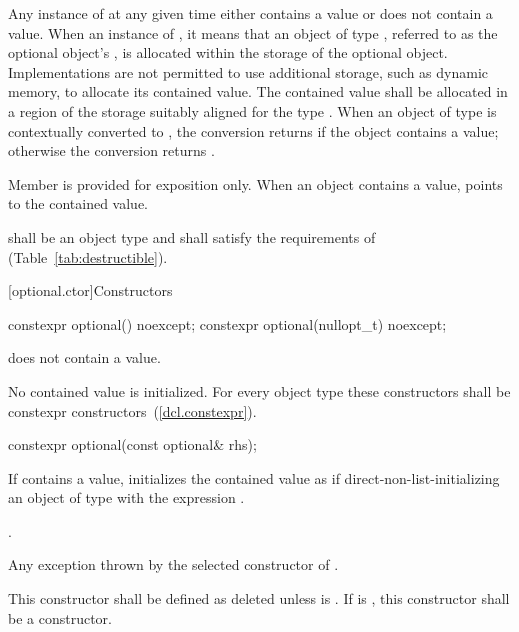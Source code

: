 \pnum
Any instance of  at any given time either contains a value or does not contain a value.
When an instance of  ,
it means that an object of type , referred to as the optional object's ,
is allocated within the storage of the optional object.
Implementations are not permitted to use additional storage, such as dynamic memory, to allocate its contained value.
The contained value shall be allocated in a region of the  storage suitably aligned for the type .
When an object of type  is contextually converted to ,
the conversion returns  if the object contains a value;
otherwise the conversion returns .

\pnum
Member  is provided for exposition only. When an  object contains a value,  points to the contained value.

\pnum
{} shall be an object type and shall satisfy the requirements of  (Table~\ref{tab:destructible}).

[optional.ctor]{Constructors}

%
\begin{itemdecl}
constexpr optional() noexcept;
constexpr optional(nullopt_t) noexcept;
\end{itemdecl}

\begin{itemdescr}
\pnum
\postconditions
{} does not contain a value.

\pnum
\remarks
No contained value is initialized.
For every object type  these constructors shall be constexpr constructors~(\ref{dcl.constexpr}).
\end{itemdescr}

%
\begin{itemdecl}
constexpr optional(const optional& rhs);
\end{itemdecl}

\begin{itemdescr}
\pnum
\effects
If  contains a value, initializes the contained value as if
direct-non-list-initializing an object of type  with the expression .

\pnum
\postconditions
{}.

\pnum
\throws
Any exception thrown by the selected constructor of .

\pnum
\remarks
This constructor shall be defined as deleted unless
 is .
If  is ,
this constructor shall be a  constructor.
\end{itemdescr}

